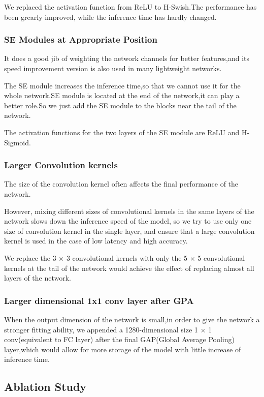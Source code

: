 \documentclass[11pt]{article}
\begin{document}
We replaced the activation function from ReLU to H-Swish.The performance has been grearly improved, while the inference time has hardly changed.

\subsubsection{SE Modules at Appropriate Position}

It does a good jib of weighting the network channels for better features,and its speed improvement version is also used in many lightweight networks.

The SE module increases the inference time,so that we cannot use it for the whole network.SE module is located at the end of the network,it can play a better role.So we just add the SE module to the blocks near the tail of the network.

The activation functions for the two layers of the SE module are ReLU and H-Sigmoid.

\subsubsection{Larger Convolution kernels}

The size of the convolution kernel often affects the final performance of the network.

However, mixing different sizes of convolutional kernels in the same layers of the network slows down the inference speed of the model, so we try to use only one size of convolution kernel in the single layer, and ensure that a large convolution kernel is used in the case of low latency and high accuracy.

We replace the 3 $\times$ 3 convolutional kernels with only the 5 $\times$ 5 convolutional kernels at the tail of the network would achieve the effect of replacing almost all layers of the network.
\subsubsection{Larger dimensional 1x1 conv layer after GPA}

When the output dimension of the network is small,in order to give the network a stronger fitting ability, we appended a 1280-dimensional size 1 $\times$ 1 conv(equivalent to FC layer) after the final GAP(Global Average Pooling) layer,which would allow for more storage of the model with little increase of inference time.

\subsection{Ablation Study}
\end{document}
